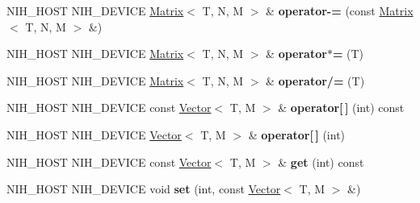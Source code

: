 \begin{DoxyCompactItemize}
\item 
\hypertarget{group__linalg_gabb807e11d90f62076f083093ed4852c4}{
\-N\-I\-H\-\_\-\-H\-O\-S\-T \-N\-I\-H\-\_\-\-D\-E\-V\-I\-C\-E \hyperlink{structnih_1_1_matrix}{\-Matrix}$<$ \-T, \*
\-N, \-M $>$ \& {\bfseries operator-\/=} (const \hyperlink{structnih_1_1_matrix}{\-Matrix}$<$ \-T, \-N, \-M $>$ \&)}
\label{group__linalg_gabb807e11d90f62076f083093ed4852c4}

\item 
\hypertarget{group__linalg_ga2f749df29033f0659b3de33cca270b1d}{
\-N\-I\-H\-\_\-\-H\-O\-S\-T \-N\-I\-H\-\_\-\-D\-E\-V\-I\-C\-E \hyperlink{structnih_1_1_matrix}{\-Matrix}$<$ \-T, \*
\-N, \-M $>$ \& {\bfseries operator$\ast$=} (\-T)}
\label{group__linalg_ga2f749df29033f0659b3de33cca270b1d}

\item 
\hypertarget{group__linalg_ga0b8324135764fc785a39bcc7737c53f2}{
\-N\-I\-H\-\_\-\-H\-O\-S\-T \-N\-I\-H\-\_\-\-D\-E\-V\-I\-C\-E \hyperlink{structnih_1_1_matrix}{\-Matrix}$<$ \-T, \*
\-N, \-M $>$ \& {\bfseries operator/=} (\-T)}
\label{group__linalg_ga0b8324135764fc785a39bcc7737c53f2}

\item 
\hypertarget{group__linalg_ga7d8d41af5d8c106a2a62c27c6271c318}{
\-N\-I\-H\-\_\-\-H\-O\-S\-T \-N\-I\-H\-\_\-\-D\-E\-V\-I\-C\-E const \*
\hyperlink{structnih_1_1_vector}{\-Vector}$<$ \-T, \-M $>$ \& {\bfseries operator\mbox{[}$\,$\mbox{]}} (int) const }
\label{group__linalg_ga7d8d41af5d8c106a2a62c27c6271c318}

\item 
\hypertarget{group__linalg_ga4925f21801c31cc9388d6f8eb1f4ab96}{
\-N\-I\-H\-\_\-\-H\-O\-S\-T \-N\-I\-H\-\_\-\-D\-E\-V\-I\-C\-E \hyperlink{structnih_1_1_vector}{\-Vector}$<$ \-T, \*
\-M $>$ \& {\bfseries operator\mbox{[}$\,$\mbox{]}} (int)}
\label{group__linalg_ga4925f21801c31cc9388d6f8eb1f4ab96}

\item 
\hypertarget{group__linalg_ga395ae2b1d7ac2d89345384ccbe8a76ae}{
\-N\-I\-H\-\_\-\-H\-O\-S\-T \-N\-I\-H\-\_\-\-D\-E\-V\-I\-C\-E const \*
\hyperlink{structnih_1_1_vector}{\-Vector}$<$ \-T, \-M $>$ \& {\bfseries get} (int) const }
\label{group__linalg_ga395ae2b1d7ac2d89345384ccbe8a76ae}

\item 
\hypertarget{group__linalg_gaecc60423b4fcded657b4f9bf42e25c5c}{
\-N\-I\-H\-\_\-\-H\-O\-S\-T \-N\-I\-H\-\_\-\-D\-E\-V\-I\-C\-E void {\bfseries set} (int, const \hyperlink{structnih_1_1_vector}{\-Vector}$<$ \-T, \-M $>$ \&)}
\label{group__linalg_gaecc60423b4fcded657b4f9bf42e25c5c}


\end{DoxyCompactItemize}
